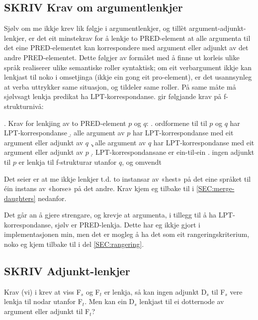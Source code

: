 \documentclass[11pt,a4paper,oneside,draft]{book}
\begin{document}
\subsection{\textbf{SKRIV} Krav om argumentlenkjer}
\label{sec-3.6.3}

Sjølv om me ikkje krev lik følgje i argumentlenkjer, og tillèt
argument-adjunkt-lenkjer, er det eit minstekrav for å lenkje to
PRED-element at alle argumenta til det eine PRED-elementet kan
korrespondere med argument eller adjunkt av det andre PRED-elementet.
Dette følgjer av formålet med å finne ut korleis ulike språk
realiserer ulike semantiske roller syntaktisk; om eit verbargument
ikkje kan lenkjast til noko i omsetjinga (ikkje ein gong eit
pro-element), er det usannsynleg at verba uttrykker same situasjon, og
tildeler same roller. På same måte må sjølvsagt lenkja predikat ha
LPT-korrespondanse. \citet[s.~75]{dyvik2009lmp} gir følgjande krav på
f-strukturnivå:

\ex. \label{PRED-krav} Krav for lenkjing av to PRED-element $p$ og $q$:
\a. ordformene til til $p$ og $q$ har LPT-korrespondanse
\b. alle argument av $p$ har LPT-korrespondanse med eit argument eller adjunkt av $q$
\c. alle argument av $q$ har LPT-korrespondanse med eit argument eller adjunkt av $p$
\d. LPT-korrespondansane er ein-til-ein
\e. ingen adjunkt til $p$ er lenkja til f-strukturar utanfor $q$, og omvendt

Det \Last[d] seier er at me ikkje lenkjer t.d. to instansar av «hest»
på det eine språket til éin instans av «horse» på det andre. Krav
\Last[e] kjem eg tilbake til i \ref{SEC:merge-daughters} nedanfor.

Det går an å gjere \Last strengare, og krevje at argumenta, i tillegg
til å ha LPT-korrespondanse, sjølv er PRED-lenkja. Dette har eg ikkje
gjort i implementasjonen min, men det er mogleg å ha det som eit
rangeringskriterium, noko eg kjem tilbake til i del
\ref{SEC:rangering}. 

\subsection{\textbf{SKRIV} Adjunkt-lenkjer}
\label{sec-3.6.4}

\label{SEC:merge-daughters}

Krav (vi) i \citet[s.~75]{dyvik2009lmp} krev at viss F$_s$ og F$_t$ er
lenkja, så kan ingen adjunkt D$_s$ til F$_s$ vere lenkja til nodar utanfor
F$_t$. Men kan ein D$_s$ lenkjast til ei dotternode av argument eller
adjunkt til F$_t$?
\end{document}
